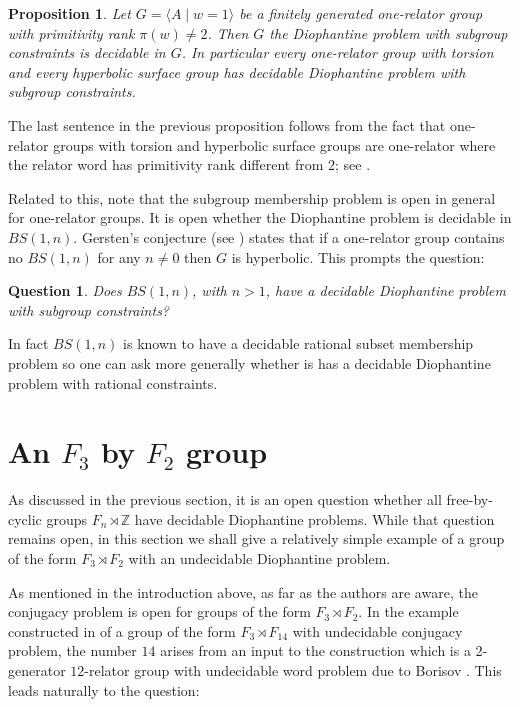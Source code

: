 \documentclass[11pt]{amsart}
\newtheorem{proposition}[theorem]{Proposition}
\newtheorem{qu}[theorem]{Question}
\theoremstyle{definition}
\numberwithin{theorem}{section}
\newcommand{\Z}{\mathbb{Z}}
\begin{document}
\begin{proposition} Let $G = \langle A \mid w=1 \rangle$ be a finitely generated one-relator group with primitivity rank $\pi(w) \neq 2$. Then $G$ the Diophantine problem with subgroup constraints is decidable in $G$. 
In particular every one-relator group with torsion and every 
hyperbolic surface group has decidable Diophantine problem with subgroup constraints.
\end{proposition}
The last sentence in the previous proposition follows from the fact that one-relator groups with torsion and hyperbolic surface groups are one-relator where the relator word has primitivity rank different from $2$; see \cite{linton2025geometry, puder2014primitive}.  

Related to this, note that the subgroup membership problem is open in general for one-relator groups. It is open whether the Diophantine problem is decidable in $BS(1,n)$. Gersten's conjecture (see \cite[Conjecture 2.6.1]{CFMarcoOneRelatorSurvey}) states that if a one-relator group contains no $BS(1,n)$ for any $n \neq 0$ then $G$ is hyperbolic. This prompts the question:  
   
\begin{qu} Does $BS(1,n)$, with $n > 1$, have a decidable Diophantine problem with subgroup constraints? \end{qu}

In fact $BS(1,n)$ is known to have a decidable rational subset membership problem \cite{Cadilhac2020} so one can ask more generally whether is has a decidable Diophantine problem with rational constraints.

\section{An $F_3$ by $F_2$ group }\label{sec:FreeByFree} 
As discussed in the previous section, it is an open question whether all free-by-cyclic groups 
$F_n \rtimes \Z$ have decidable Diophantine problems.  While that question remains open, in this section we shall give a relatively simple example of a group of the form $F_3 \rtimes F_2$ with an undecidable Diophantine problem.  

As mentioned in the introduction above, as far as the authors are aware, the conjugacy problem is open for groups of the form $F_3 \rtimes F_2$. In the example constructed in \cite{BogopolskiMartinoVentura} of a group of the form $F_3 \rtimes F_{14}$ with undecidable conjugacy problem, the number $14$ arises from an input to the construction which is a $2$-generator $12$-relator group with undecidable word problem due to Borisov \cite{Borisov1969}.   This leads naturally to the question: 
\end{document}
